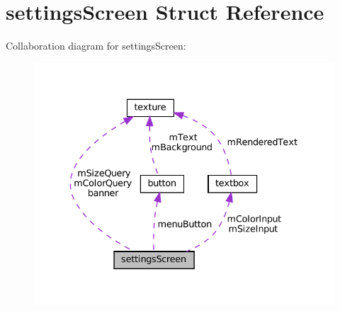 \hypertarget{structsettings_screen}{}\section{settings\+Screen Struct Reference}
\label{structsettings_screen}


Collaboration diagram for settings\+Screen\+:
\nopagebreak
\begin{figure}[H]
\begin{center}
\leavevmode
\includegraphics[width=333pt]{structsettings_screen__coll__graph}
\end{center}
\end{figure}
